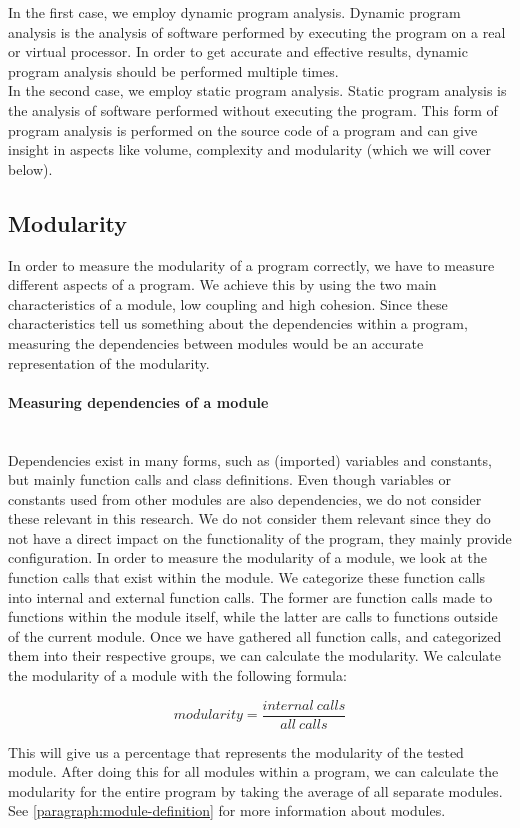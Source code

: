\documentclass[twoside]{uva-inf-bachelor-thesis}
\newcommand{\myparagraph}[1]{\paragraph{#1}\mbox{}\\}
\begin{document}
In the first case, we employ dynamic program analysis\cite{nielson2015principles}.
Dynamic program analysis is the analysis of software performed by executing the program on a real or virtual processor. In order to get accurate and effective results, dynamic program analysis should be performed multiple times.\\

In the second case, we employ static program analysis\cite{nielson2015principles}.
Static program analysis is the analysis of software performed without executing the program. This form of program analysis is performed on the source code of a program and can give insight in aspects like volume, complexity and modularity (which we will cover below).

\subsection{Modularity}
In order to measure the modularity of a program correctly, we have to measure different aspects of a program. We achieve this by using the two main characteristics of a module, low coupling and high cohesion. Since these characteristics tell us something about the dependencies within a program, measuring the dependencies between modules would be an accurate representation of the modularity.  

\myparagraph{Measuring dependencies of a module}
Dependencies exist in many forms, such as (imported) variables and constants, but mainly function calls and class definitions. Even though variables or constants used from other modules are also dependencies, we do not consider these relevant in this research. We do not consider them relevant since they do not have a direct impact on the functionality of the program, they mainly provide configuration. In order to measure the modularity of a module, we look at the function calls that exist within the module. We categorize these function calls into internal and external function calls. The former are function calls made to functions within the module itself, while the latter are calls to functions outside of the current module. Once we have gathered all function calls, and categorized them into their respective groups, we can calculate the modularity. We calculate the modularity of a module with the following formula:

\[ modularity = \dfrac{internal\ calls}{all\ calls} \]

This will give us a percentage that represents the modularity of the tested module. After doing this for all modules within a program, we can calculate the modularity for the entire program by taking the average of all separate modules. See \autoref{paragraph:module-definition} for more information about modules.
\end{document}
